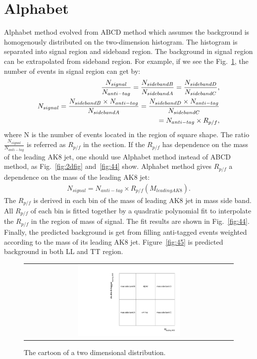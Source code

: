 \section{Alphabet}
Alphabet method evolved from ABCD method which assumes the background is homogenously distributed on the two-dimension histogram. The histogram is separated into signal region and sideband region. The background in signal region can be extrapolated from sideband region. For example, if we see the Fig.~\ref{fig:42}, the number of events in signal region can get by:
\begin{equation} 
\centering
\begin{split}
\frac{N_{signal}}{N_{anti-tag}} = \frac{N_{side band B}}{N_{side band A}} = \frac{N_{side band D}}{N_{side band C}}, \\
N_{signal} = \frac{N_{side band B} \times N_{anti-tag}}{N_{side band A}} = \frac{N_{side band D} \times N_{anti-tag}}{N_{side band C}} \\
= N_{anti-tag} \times R_{p/f}, \\
\end{split}
\end{equation}
where N is the number of events located in the region of square shape. The ratio $\frac{N_{signal}}{N_{anti-tag}}$ is referred as $R_{p/f}$ in the section. If the $R_{p/f}$ has dependence on the mass of the leading AK8 jet, one should use Alphabet method instead of ABCD method, as Fig.~\ref{fig:2dfig} and~\ref{fig:44} show. Alphabet method gives $R_{p/f}$ a dependence on the mass of the leading AK8 jet:
\begin{equation} 
\begin{split}
N_{signal} = N_{anti-tag} \times R_{p/f} (M_{leading AK8}).
\end{split}
\end{equation}
The $R_{p/f}$ is derived in each bin of the mass of leading AK8 jet in mass side band. All $R_{p/f}$ of each bin is fitted together by a quadratic polynomial fit to interpolate the $R_{p/f}$ in the region of mass of signal. The fit results are shown in Fig.~\ref{fig:44}. Finally, the predicted background is get from filling anti-tagged events weighted according to the mass of its leading AK8 jet. Figure~\ref{fig:45} is predicted background in both LL and TT region. 

\begin{figure}[t]
  \centering
  \begin{tabular}{c}
    \includegraphics[width=0.5\textwidth]{Figures/cart2.pdf} 
 
  \end{tabular}
  \caption{The cartoon of a two dimensional distribution.}
  \label{fig:42}
  \end{figure}
  
